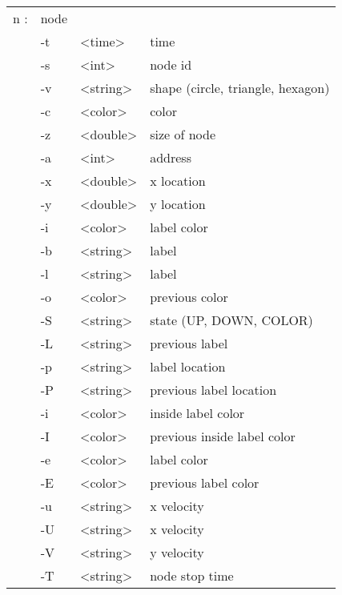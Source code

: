   \begin{tabular}{llll}
  n : & node & & \\
    &  -t & <time> & time \\
    &  -s & <int> & node id \\
    &  -v & <string> & shape (circle, triangle, hexagon) \\
    &  -c & <color> & color \\
    &  -z & <double> & size of node \\
    &  -a & <int> & address \\
    &  -x & <double> & x location \\
    &  -y & <double> & y location \\
    &  -i & <color> & label color \\
    &  -b & <string> & label \\
    &  -l & <string> & label \\
    &  -o & <color> & previous color \\
    &  -S & <string> & state (UP, DOWN, COLOR) \\
    &  -L & <string> & previous label \\
    &  -p & <string> & label location \\
    &  -P & <string> & previous label location \\
    &  -i & <color> & inside label color \\
    &  -I & <color> & previous inside label color \\
    &  -e & <color> & label color \\
    &  -E & <color> & previous label color \\
    &  -u & <string> & x velocity \\
    &  -U & <string> & x velocity \\
    &  -V & <string> & y velocity \\
    &  -T & <string> & node stop time \\
  \end{tabular}

